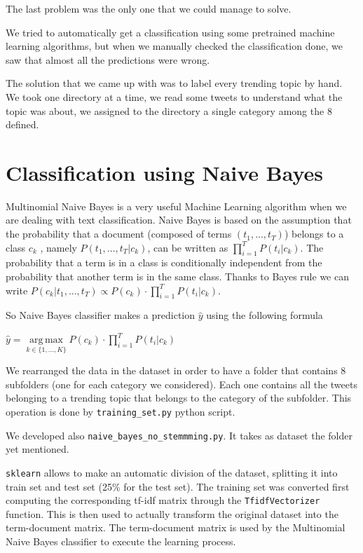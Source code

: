 \documentclass[journal,11pt]{vgtc}
\DeclareMathOperator*{\argmax}{arg\,max}
\begin{document}
The last problem was the only one that we could manage to solve.

We tried to automatically get a classification using some pretrained machine learning algorithms, but when we
manually checked the classification done, we saw that almost all the predictions were wrong.

The solution that we came up with was to label every trending topic by hand.
We took one directory at a time, we read some tweets to understand what the topic was about,
we assigned to the directory a single category among the 8 defined.

\section{Classification using Naive Bayes}
Multinomial Naive Bayes is a very useful Machine Learning algorithm when we are dealing with
text classification.
Naive Bayes is based on the assumption that the probability that a document (composed of terms $(t_1,...,t_T)$) belongs to a class $c_k$
, namely $P(t_1, ..., t_T | c_k) $, can be written as $\prod\limits_{i=1}^{T}P(t_i|c_k)$.
The probability that a term is in a class is conditionally independent from the probability that
 another term is in the same class.
 Thanks to Bayes rule we can write $P(c_k | t_1, ..., t_T) \propto P(c_k) \cdot \prod\limits_{i=1}^{T}P(t_i|c_k)$.

 So Naive Bayes classifier makes a prediction $\hat{y}$ using the following formula

\begin{center}
$\hat{y} = \argmax\limits_{k \in \{1, ..., K \}} P(c_k) \cdot \prod\limits_{i = 1}^{T} P(t_i | c_k)$
\end{center}

We rearranged the data in the dataset in order to have a folder that contains 8 subfolders (one for each
category we considered). Each one contains all the tweets belonging to a trending topic that belongs to the category of the subfolder.
This operation is done by \texttt{training\_set.py} python script.

We developed also \texttt{naive\_bayes\_no\_stemmming.py}. It takes as dataset the folder yet mentioned.

\texttt{sklearn} allows to make an automatic division of the dataset, splitting it into train set and
test set (25\% for the test set).
The training set was converted first computing the corresponding tf-idf matrix through the \texttt{TfidfVectorizer} function.
This is then used to actually transform the original dataset into the term-document matrix.
The term-document matrix is used by the Multinomial Naive Bayes classifier to execute the learning process.
\end{document}
